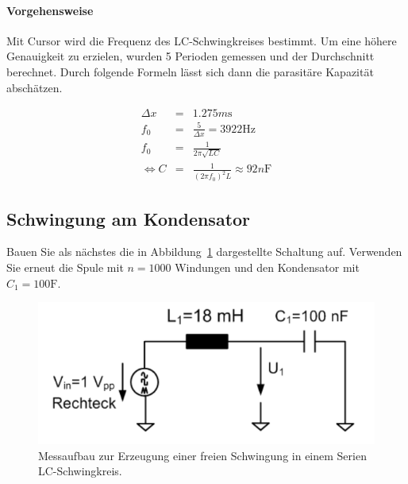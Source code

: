 \documentclass[10pt]{scrreprt}
\begin{document}
        \paragraph{Vorgehensweise}
        Mit Cursor wird die Frequenz des LC-Schwingkreises bestimmt. Um eine höhere
        Genauigkeit zu erzielen, wurden 5 Perioden gemessen und der Durchschnitt
        berechnet. Durch folgende Formeln lässt sich dann die parasitäre Kapazität
        abschätzen.

        \begin{eqnarray}
            \Delta x &=& 1.275\si{m\second}\\
            f_0 &=& \frac{5}{\Delta x} = 3922\si{\hertz}\\
            f_0 &=& \frac{1}{2 \pi \sqrt{L C}}\\
            \Leftrightarrow C &=& \frac{1}{{(2 \pi f_0)}^2 L} \approx 92\si{n\farad}
        \end{eqnarray}

        \subsection{Schwingung am Kondensator}
        Bauen Sie als nächstes die in Abbildung~\ref{fig:abb16} dargestellte Schaltung auf. Verwenden
        Sie erneut die Spule mit $n = 1000$ Windungen und den Kondensator mit $C_1 =
        100 \si{\farad}$.

        \begin{center}
            \begin{figure}[H]
                \includegraphics[width=\textwidth]{Abbildung16.png}
                \caption{Messaufbau zur Erzeugung einer freien Schwingung in einem Serien LC-Schwingkreis.}
                \label{fig:abb16}
            \end{figure}
        \end{center}
\end{document}
